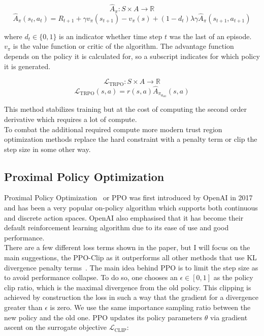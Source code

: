\documentclass{article}
\begin{document}
\begin{equation}
    \hat A_\pi : S \times A \xrightarrow{} \mathbb{R} 
\end{equation}
\begin{equation*}
    \hat A_\pi(s_t, a_t)  = R_{t+1} + \gamma v_\pi(s_{t+1}) - v_\pi(s) + (1-d_t) \lambda \gamma \hat A_\pi(s_{t+1}, a_{t+1})
\end{equation*}

where $d_t \in \{0,1\}$ is an indicator whether time step $t$ was the last of an episode.
$v_\pi$ is the value function or critic of the algorithm.
The advantage function depends on the policy it is calculated for, so a subscript
indicates for which policy it is generated.

\begin{equation}
    {\mathcal L}_{\text{TRPO}}: S \times A \xrightarrow{} \mathbb{R}
\end{equation}
\begin{equation*}
    {\mathcal L}_{\text{TRPO}}(s, a) ={r(s, a) \hat A_{\pi_{\theta_{\text{old}}}}(s,a)}
\end{equation*}

\noindent This method stabilizes training but at the cost of computing the second order derivative
which requires a lot of compute.\\
To combat the additional required compute more modern trust region optimization methods
replace the hard constraint with a penalty term or clip the step size in some other way.

\subsection{Proximal Policy Optimization}
\noindent Proximal Policy Optimization~\cite{DBLP:journals/corr/SchulmanWDRK17} or PPO was first
introduced by OpenAI in 2017 and
has been a very popular on-policy algorithm which supports both continuous and
discrete action spaces. OpenAI also emphasised that it has become their default
reinforcement learning algorithm due to its ease of use and good performance.\\
There are a few different loss terms shown in the paper, but I will focus on the main
suggestions, the PPO-Clip as it outperforms all other methods that use KL divergence penalty terms~\cite{DBLP:journals/corr/abs-2006-05990}.
The main idea behind PPO is to limit the step size as to avoid performance
collapse. To do so, one chooses an $\epsilon \in [0,1]$ as the policy clip ratio,
which is the maximal divergence from the old policy. This clipping is achieved
by construction the loss in such a way that the gradient for a divergence greater than $\epsilon$ is zero.
We use the same importance sampling ratio between the new policy and the old one.
PPO updates its policy parameters $\theta$ via gradient ascent on the surrogate objective ${\mathcal L}_{\mathrm{CLIP}}$:
\end{document}
